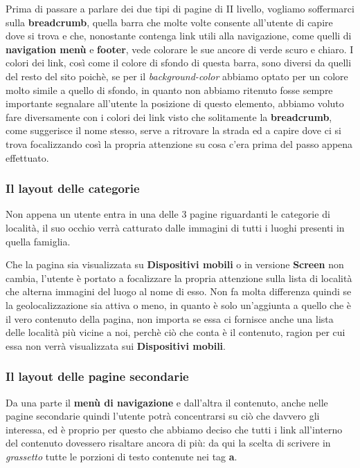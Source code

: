 Prima di passare a parlare dei due tipi di pagine di II livello, vogliamo
soffermarci sulla \textbf{breadcrumb}, quella barra che molte volte consente
all'utente di capire dove si trova e che, nonostante contenga link utili alla
navigazione, come quelli di \textbf{navigation menù} e \textbf{footer}, vede
colorare le sue ancore di verde scuro e chiaro. I colori dei link, così come
il colore di sfondo di questa barra, sono diversi da quelli del resto del sito
poichè, se per il \textit{background-color} abbiamo optato per un colore molto
simile a quello di sfondo, in quanto non abbiamo ritenuto fosse sempre
importante segnalare all'utente la posizione di questo elemento, abbiamo
voluto fare diversamente con i colori dei link visto che solitamente la
\textbf{breadcrumb}, come suggerisce il nome stesso, serve a ritrovare la
strada ed a capire dove ci si trova focalizzando così la propria attenzione su
cosa c'era prima del passo appena effettuato.

\subsubsection{Il layout delle categorie}\label{sec:Pres-IIliv-cat}
Non appena un utente entra in una delle 3 pagine riguardanti le categorie di
località, il suo occhio verrà catturato dalle immagini di tutti i luoghi
presenti in quella famiglia.

Che la pagina sia visualizzata su \textbf{Dispositivi mobili} o in versione
\textbf{Screen} non cambia, l'utente è portato a focalizzare la propria
attenzione sulla lista di località che alterna immagini del luogo al nome di
esso. Non fa molta differenza quindi se la geolocalizzazione sia attiva o
meno, in quanto è solo un'aggiunta a quello che è il vero contenuto della
pagina, non importa se essa ci fornisce anche una lista delle località più
vicine a noi, perchè ciò che conta è il contenuto, ragion per cui essa non
verrà visualizzata sui \textbf{Dispositivi mobili}.

\subsubsection{Il layout delle pagine secondarie}\label{sec:Pres-IIliv-sec}
Da una parte il \textbf{menù di navigazione} e dall'altra il contenuto, anche
nelle pagine secondarie quindi l'utente potrà concentrarsi su ciò che davvero
gli interessa, ed è proprio per questo che abbiamo deciso che tutti i link
all'interno del contenuto dovessero risaltare ancora di più: da qui la scelta
di scrivere in \textit{grassetto} tutte le porzioni di testo contenute nei tag
\textbf{a}.

